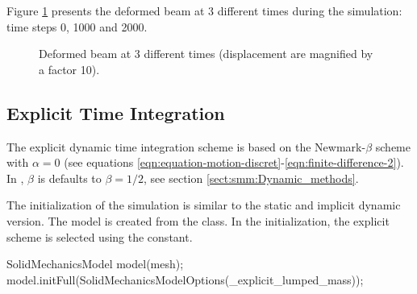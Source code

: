 Figure \ref{fig:smm:implicit:dynamic_solution} presents the deformed
beam at 3 different times during the simulation: time steps 0, 1000 and
2000.

\begin{figure}[!htb]
  \centering
  \setlength{\unitlength}{0.1\textwidth}

  \caption{Deformed beam at 3 different times (displacement are
    magnified by a factor 10).}
  \label{fig:smm:implicit:dynamic_solution}
\end{figure}

\subsection{Explicit Time Integration}
\label{ssect:smm:expl-time-integr}

The explicit dynamic time integration scheme is based on the
Newmark-$\beta$ scheme with $\alpha=0$ (see equations
\ref{eqn:equation-motion-discret}-\ref{eqn:finite-difference-2}).  In
\akantu, $\beta$ is defaults to $\beta=1/2$, see section
\ref{sect:smm:Dynamic_methods}.

The initialization of the simulation is similar to the static and
implicit dynamic version.  The model is created from the
 class.  In the initialization, the explicit
scheme is selected using the  constant.

\begin{cpp}
SolidMechanicsModel model(mesh);
model.initFull(SolidMechanicsModelOptions(_explicit_lumped_mass));
\end{cpp}

